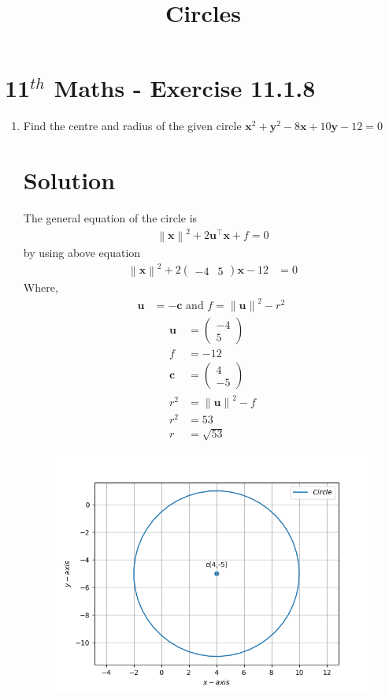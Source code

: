 \documentclass[12pt]{article}
\providecommand{\norm}[1]{\left\lVert#1\right\rVert}
\newcommand{\myvec}[1]{\ensuremath{\begin{pmatrix}#1\end{pmatrix}}}
\let\vec\mathbf
\begin{document}
\begin{center}
\title{\textbf{Circles}}
\date{\vspace{-5ex}} %
\maketitle
\end{center}
\setcounter{page}{1}
\section{11$^{th}$ Maths - Exercise 11.1.8}

\begin{enumerate}
\item Find the centre and radius of the given circle $\vec{x}^2+\vec{y}^2-8\vec{x}+10\vec{y}-12=0$
\section{Solution}
The general equation of  the circle is 
\begin{align}
\norm{\vec{x}}^{2} + 2\vec{u}^{\top}\vec{x} + f = 0
\end{align}
by using above equation
\begin{align}
	\norm{\vec{x}}^2+2\myvec{-4 & 5}\vec{x}-12&=0
\end{align}	
Where,
\begin{align}
	\vec{u} &= -\vec{c} \text{ and } f = \norm{\vec{u}}^{2} - r^{2}\
\end{align}
\begin{align}
 \vec{u}&=\myvec{-4\\5}\\
 f&=-12\\
\vec{c}&=\myvec{4 \\ -5}\\
r^2&=\norm{\vec{u}}^2-f\\
r^2&= 53\\
r&=\sqrt{53}
\end{align}
\begin{figure}[!h]
	\begin{center} 
	   \includegraphics[width=\columnwidth]{figs/11.1.8.png}
	\end{center}
\caption{}
\label{fig:Fig1}
\end{figure}
\end{enumerate}
\end{document}
